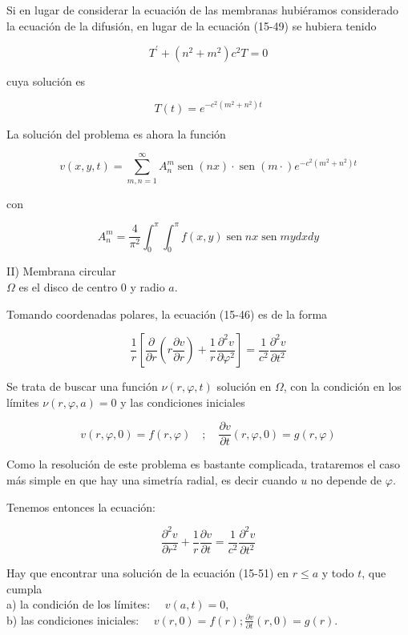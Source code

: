 \documentclass[10pt]{article}
\theoremstyle{plain}
\theoremstyle{definition}
\theoremstyle{remark}
\begin{document}
Si en lugar de considerar la ecuación de las membranas hubiéramos considerado la ecuación de la difusión, en lugar de la ecuación (15-49) se hubiera tenido

$$
T^{\prime}+\left(n^{2}+m^{2}\right) c^{2} T=0
$$

cuya solución es

$$
T(t)=e^{-c^{2}\left(m^{2}+n^{2}\right) t}
$$

La solución del problema es ahora la función

$$
v(x, y, t)=\sum_{m, n=1}^{\infty} A_{n}^{m} \operatorname{sen}(n x) \cdot \operatorname{sen}(m \cdot) e^{-c^{2}\left(m^{2}+n^{2}\right) t}
$$

con

$$
A_{n}^{m}=\frac{4}{\pi^{2}} \int_{0}^{\pi} \int_{0}^{\pi} f(x, y) \operatorname{sen} n x \operatorname{sen} m y d x d y
$$

II) Membrana circular\\
$\Omega$ es el disco de centro 0 y radio $a$.

Tomando coordenadas polares, la ecuación (15-46) es de la forma

$$
\frac{1}{r}\left[\frac{\partial}{\partial r}\left(r \frac{\partial v}{\partial r}\right)+\frac{1}{r} \frac{\partial^{2} v}{\partial \varphi^{2}}\right]=\frac{1}{c^{2}} \frac{\partial^{2} v}{\partial t^{2}}
$$

Se trata de buscar una función $\nu(r, \varphi, t)$ solución en $\Omega$, con la condición en los límites $\nu(r, \varphi, a)=0$ y las condiciones iniciales

$$
v(r, \varphi, 0)=f(r, \varphi) \quad ; \quad \frac{\partial v}{\partial t}(r, \varphi, 0)=g(r, \varphi)
$$

Como la resolución de este problema es bastante complicada, trataremos el caso más simple en que hay una simetría radial, es decir cuando $u$ no depende de $\varphi$.

Tenemos entonces la ecuación:


\begin{equation*}
\frac{\partial^{2} v}{\partial r^{2}}+\frac{1}{r} \frac{\partial v}{\partial t}=\frac{1}{c^{2}} \frac{\partial^{2} v}{\partial t^{2}} \tag{15-51}
\end{equation*}


Hay que encontrar una solución de la ecuación (15-51) en $r \leqslant a$ y todo $t$, que cumpla\\
a) la condición de los límites: $\quad v(a, t)=0$,\\
b) las condiciones iniciales: $\quad v(r, 0)=f(r) ; \frac{\partial v}{\partial t}(r, 0)=g(r)$.
\end{document}

